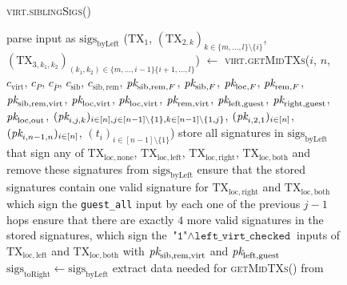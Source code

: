 \begin{figure}[H]
  \begin{processbox}{\textsc{virt.siblingSigs}()}
    \begin{algorithmic}[1]
      \State parse input as $\mathrm{sigs}_{\mathrm{byLeft}}$
      \State ($\mathrm{TX}_1$, $(\mathrm{TX}_{2, k})_{k \in \{m, \dots, l\}
      \setminus \{i\}}$, $(\mathrm{TX}_{3, k_1, k_2})_{(k_1, k_2) \in \{m,
      \dots, i-1\} \{i+1, \dots, l\}}$) $\gets$ \textsc{virt.getMidTXs}($i$,
      $n$, $c_{\mathrm{virt}}$, $c_P$, $c_{\bar{P}}$, $c_{\mathrm{sib}}$,
      $c_{\mathrm{sib}, \mathrm{rem}}$,
      $\textit{pk}_{\mathrm{sib}, \mathrm{rem}, F}$, $\textit{pk}_{\mathrm{sib}, F}$,
      $\textit{pk}_{\mathrm{loc}, F}$, $\textit{pk}_{\mathrm{rem}, F}$, $\textit{pk}_{\mathrm{sib},
      \mathrm{rem}, \mathrm{virt}}$, $\textit{pk}_{\mathrm{loc}, \mathrm{virt}}$,
      $\textit{pk}_{\mathrm{loc}, \mathrm{virt}}$, $\textit{pk}_{\mathrm{rem}, \mathrm{virt}}$,
      $\textit{pk}_{\mathrm{left}, \mathrm{guest}}$, $\textit{pk}_{\mathrm{right},
      \mathrm{guest}}$, $\textit{pk}_{\mathrm{loc}, \mathrm{out}}$, $(\textit{pk}_{i,j,k})_{i
      \in [n], j \in [n-1] \setminus \{1\}, k \in [n-1] \setminus \{1, j\}}$,
      $(\textit{pk}_{i, 2, 1})_{i \in [n]}$, $(\textit{pk}_{i, n-1, n})_{i \in [n]}$,
      $(t_i)_{i \in [n-1] \setminus \{1\}}$)
      \State store all signatures in $\mathrm{sigs}_{\mathrm{byLeft}}$ that sign
      any of $\mathrm{TX}_{\mathrm{loc}, \mathrm{none}}$,
      $\mathrm{TX}_{\mathrm{loc}, \mathrm{left}}$, $\mathrm{TX}_{\mathrm{loc},
      \mathrm{right}}$, $\mathrm{TX}_{\mathrm{loc}, \mathrm{both}}$ and remove
      these signatures from $\mathrm{sigs}_{\mathrm{byLeft}}$
      \State ensure that the stored signatures contain one valid
      signature for $\mathrm{TX}_{\mathrm{loc}, \mathrm{right}}$ and
      $\mathrm{TX}_{\mathrm{loc}, \mathrm{both}}$ which sign the
      \texttt{guest\_all} input by each one of the previous $j-1$ hops
      \State ensure that there are exactly $4$ more valid signatures in the
      stored signatures, which sign the $\texttt{"1"} \wedge
      \texttt{left\_virt\_checked}$ inputs of $\mathrm{TX}_{\mathrm{loc},
      \mathrm{left}}$ and $\mathrm{TX}_{\mathrm{loc}, \mathrm{both}}$ with
      $\textit{pk}_{\mathrm{sib}, \mathrm{rem}, \mathrm{virt}}$ and $\textit{pk}_{\mathrm{left},
      \mathrm{guest}}$
      \State $\mathrm{sigs}_{\mathrm{toRight}} \gets
      \mathrm{sigs}_{\mathrm{byLeft}}$
       
        \State extract data needed for \textsc{getMidTXs}() from

\end{algorithmic}
\end{processbox}
\end{figure}
